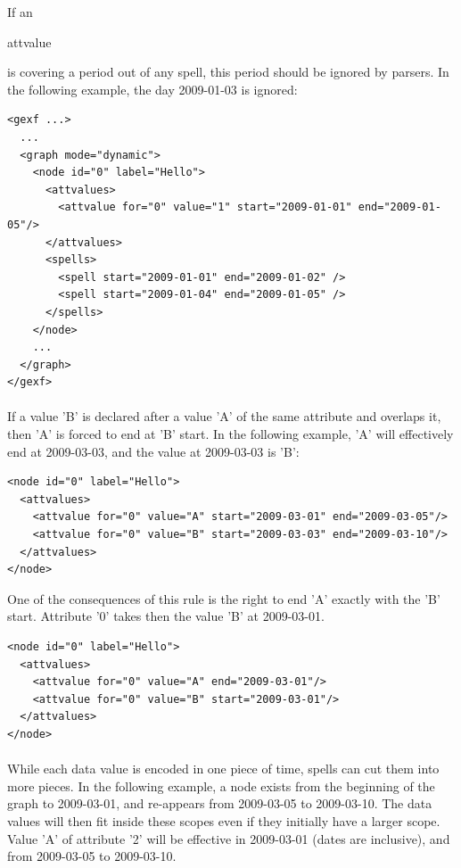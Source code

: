 \documentclass[a4paper,10pt]{article}
\begin{document}
If an \begin{footnotesize}attvalue\end{footnotesize} is covering a period out of any spell, this period should be ignored by parsers. In the following example, the day 2009-01-03 is ignored:

\lstset{ style=gexf }
\begin{lstlisting}[caption={Spells and attvalues}]
<gexf ...>
  ...
  <graph mode="dynamic">
    <node id="0" label="Hello">
      <attvalues>
        <attvalue for="0" value="1" start="2009-01-01" end="2009-01-05"/>
      </attvalues>
      <spells>
        <spell start="2009-01-01" end="2009-01-02" />
        <spell start="2009-01-04" end="2009-01-05" />
      </spells>
    </node>
    ...
  </graph>
</gexf>
\end{lstlisting}

\paragraph{}
If a value 'B' is declared after a value 'A' of the same attribute and overlaps it, then 'A' is forced to end at 'B' start. In the following example, 'A' will effectively end at 2009-03-03, and the value at 2009-03-03 is 'B':

\lstset{ style=gexf }
\begin{lstlisting}[caption={Value overlapping}]
<node id="0" label="Hello">
  <attvalues>
    <attvalue for="0" value="A" start="2009-03-01" end="2009-03-05"/>
    <attvalue for="0" value="B" start="2009-03-03" end="2009-03-10"/>
  </attvalues>
</node>
\end{lstlisting}

One of the consequences of this rule is the right to end 'A' exactly with the 'B' start. Attribute '0' takes then the value 'B' at 2009-03-01.

\lstset{ style=gexf }
\begin{lstlisting}[caption={Value transition}]
<node id="0" label="Hello">
  <attvalues>
    <attvalue for="0" value="A" end="2009-03-01"/>
    <attvalue for="0" value="B" start="2009-03-01"/>
  </attvalues>
</node>
\end{lstlisting}

\paragraph{}
While each data value is encoded in one piece of time, spells can cut them into more pieces. In the following example, a node exists from the beginning of the graph to 2009-03-01, and re-appears from 2009-03-05 to 2009-03-10. The data values will then fit inside these scopes even if they initially have a larger scope. Value 'A' of attribute '2' will be effective in 2009-03-01 (dates are inclusive), and from 2009-03-05 to 2009-03-10.
\end{document}
